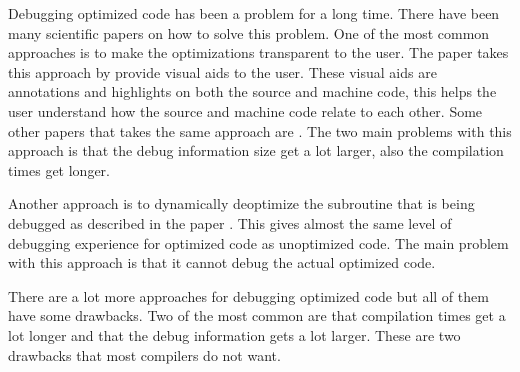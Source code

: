 

Debugging optimized code has been a problem for a long time.
There have been many scientific papers on how to solve this problem.
One of the most common approaches is to make the optimizations transparent to the user.
The paper \cite{edselc.2-52.0-8497669319919920107} takes this approach by provide visual aids to the user.
These visual aids are annotations and highlights on both the source and machine code, this helps the user understand how the source and machine code relate to each other.
Some other papers that takes the same  approach are \cite{adl1996source, edselc.2-52.0-002842706219940105}.
The two main problems with this approach is that the debug information size get a lot larger, also the compilation times get longer.


Another approach is to dynamically deoptimize the subroutine that is being debugged as described in the paper \cite{edselc.2-52.0-002699386519920107}.
This gives almost the same level of debugging experience for optimized code as unoptimized code.
The main problem with this approach is that it cannot debug the actual optimized code.


There are a lot more approaches for debugging optimized code but all of them have some drawbacks.
Two of the most common are that compilation times get a lot longer and that the debug information gets a lot larger.
These are two drawbacks that most compilers do not want.




